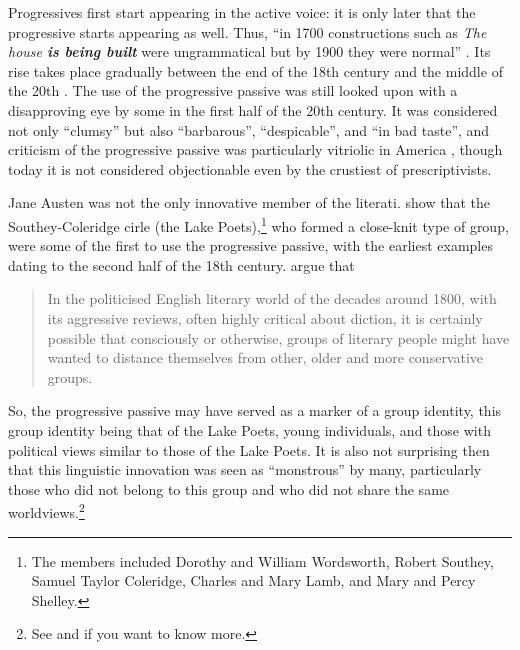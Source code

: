 Progressives first start appearing in the active voice: it is only later that the progressive  starts appearing as well. Thus, ``in 1700 constructions such as \textit{The house \textbf{is being built}} were ungrammatical but by 1900 they were normal'' \citep[66]{Beal2004}. Its rise takes place gradually between the end of the 18th century and the middle of the 20th \citep{Hundt2004passival}. The use of the progressive passive was still looked upon with a disapproving eye by some in the first half of the 20th century. It was considered not only ``clumsy'' \citep[82]{Beal2004} but also ``barbarous'', ``despicable'', and ``in bad taste'', and criticism of the progressive passive was particularly vitriolic in America \citep{Anderwald2014}, though today it is not considered objectionable even by the crustiest of prescriptivists.

Jane Austen was not the only innovative member of the literati. \citet{PraatDenison2001} show that the Southey-Coleridge cirle (the Lake Poets),\footnote{The members included Dorothy and William Wordsworth, Robert Southey, Samuel Taylor Coleridge, Charles and Mary Lamb, and Mary  and Percy Shelley.} who formed a close-knit type of group, were some of the first to use the progressive passive, with the earliest examples dating to the second half of the 18th century. \citet[416]{PraatDenison2001} argue that

\begin{quote}
    In the politicised English literary world of the decades around 1800, with its aggressive reviews, often highly critical about diction, it is certainly possible that consciously or otherwise, groups of literary people might have wanted to distance themselves from other, older and more conservative groups.
\end{quote}
So, the progressive passive may have served as a marker of a group identity, this group identity being that of the Lake Poets, young individuals, and those with political views similar to those of the Lake Poets. It is also not surprising then that this linguistic innovation was seen as ``monstrous'' by many, particularly those who did not belong to this group and who did not share the same worldviews.\footnote{See \citet[418--419]{PraatDenison2001} and \citet{vanBergen2013} if you want to know more.}


